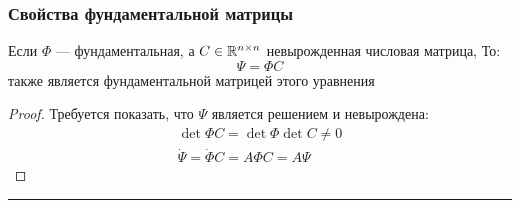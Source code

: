 \subsubsection{Свойства фундаментальной
матрицы}\label{ux441ux432ux43eux439ux441ux442ux432ux430-ux444ux443ux43dux434ux430ux43cux435ux43dux442ux430ux43bux44cux43dux43eux439-ux43cux430ux442ux440ux438ux446ux44b}

Если \(\Phi\) --- фундаментальная, а \(C\in\mathbb R^{n\times n}\)
невырожденная числовая матрица, То: \[\Psi = \Phi C\] также является
фундаментальной матрицей этого уравнения

\begin{proof}
  Требуется показать, что $\Psi$ является решением и невырождена:
  $$\begin{aligned}
  \det \Phi C = \det \Phi \det C \neq 0 \\
  \dot \Psi = \dot \Phi C = A \Phi C = A \Psi
  \end{aligned}$$
  \end{proof}

\begin{center}\rule{0.5\linewidth}{\linethickness}\end{center}
